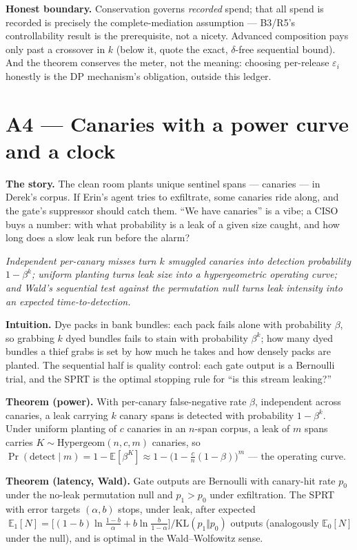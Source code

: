 \documentclass[11pt,a4paper]{article}
\newcommand{\onebreath}[1]{\begin{center}\emph{#1}\end{center}}
\begin{document}
\begin{boundary}
\textbf{Honest boundary.} Conservation governs \emph{recorded} spend; that all spend is recorded is precisely the complete-mediation assumption --- B3/R5's controllability result is the prerequisite, not a nicety. Advanced composition pays only past a crossover in $k$ (below it, quote the exact, $\delta$-free sequential bound). And the theorem conserves the meter, not the meaning: choosing per-release $\varepsilon_i$ honestly is the DP mechanism's obligation, outside this ledger.
\end{boundary}

\section{A4 --- Canaries with a power curve and a clock}
\textbf{The story.} The clean room plants unique sentinel spans --- canaries --- in Derek's corpus. If Erin's agent tries to exfiltrate, some canaries ride along, and the gate's suppressor should catch them. ``We have canaries'' is a vibe; a CISO buys a number: with what probability is a leak of a given size caught, and how long does a slow leak run before the alarm?

\onebreath{Independent per-canary misses turn $k$ smuggled canaries into detection probability $1-\beta^k$; uniform planting turns leak \emph{size} into a hypergeometric operating curve; and Wald's sequential test against the permutation null turns leak \emph{intensity} into an expected time-to-detection.}

\textbf{Intuition.} Dye packs in bank bundles: each pack fails alone with probability $\beta$, so grabbing $k$ dyed bundles fails to stain with probability $\beta^k$; how many dyed bundles a thief grabs is set by how much he takes and how densely packs are planted. The sequential half is quality control: each gate output is a Bernoulli trial, and the SPRT is the optimal stopping rule for ``is this stream leaking?''

\begin{thebox}
\textbf{Theorem (power).} With per-canary false-negative rate $\beta$, independent across canaries, a leak carrying $k$ canary spans is detected with probability $1-\beta^k$. Under uniform planting of $c$ canaries in an $n$-span corpus, a leak of $m$ spans carries $K\sim\mathrm{Hypergeom}(n,c,m)$ canaries, so $\Pr(\text{detect}\mid m)=1-\mathbb{E}[\beta^K]\approx 1-\bigl(1-\tfrac{c}{n}(1-\beta)\bigr)^m$ --- the operating curve.

\textbf{Theorem (latency, Wald).} Gate outputs are Bernoulli with canary-hit rate $p_0$ under the no-leak permutation null and $p_1>p_0$ under exfiltration. The SPRT with error targets $(\alpha,b)$ stops, under leak, after expected $\;\mathbb{E}_1[N]=\bigl[(1-b)\ln\tfrac{1-b}{\alpha}+b\ln\tfrac{b}{1-\alpha}\bigr]/\mathrm{KL}(p_1\Vert p_0)$ outputs (analogously $\mathbb{E}_0[N]$ under the null), and is optimal in the Wald--Wolfowitz sense.
\end{thebox}
\end{document}

